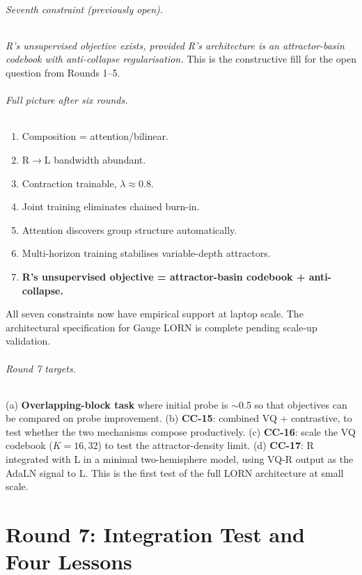 \documentclass[10pt, twocolumn, a4paper]{article}
\begin{document}
\paragraph{Seventh constraint (previously open).} \emph{R's unsupervised objective exists, provided R's architecture is an attractor-basin codebook with anti-collapse regularisation.} This is the constructive fill for the open question from Rounds 1--5.

\paragraph{Full picture after six rounds.}
\begin{enumerate}[nosep,leftmargin=*]
\item Composition = attention/bilinear.
\item R$\to$L bandwidth abundant.
\item Contraction trainable, $\lambda \approx 0.8$.
\item Joint training eliminates chained burn-in.
\item Attention discovers group structure automatically.
\item Multi-horizon training stabilises variable-depth attractors.
\item \textbf{R's unsupervised objective = attractor-basin codebook + anti-collapse.}
\end{enumerate}

All seven constraints now have empirical support at laptop scale. The architectural specification for Gauge LORN is complete pending scale-up validation.

\paragraph{Round 7 targets.}
(a) \textbf{Overlapping-block task} where initial probe is $\sim$0.5 so that objectives can be compared on probe improvement.
(b) \textbf{CC-15}: combined VQ + contrastive, to test whether the two mechanisms compose productively.
(c) \textbf{CC-16}: scale the VQ codebook ($K = 16, 32$) to test the attractor-density limit.
(d) \textbf{CC-17}: R integrated with L in a minimal two-hemisphere model, using VQ-R output as the AdaLN signal to L. This is the first test of the full LORN architecture at small scale.


\part*{Round 7: Integration Test and Four Lessons}
\end{document}
